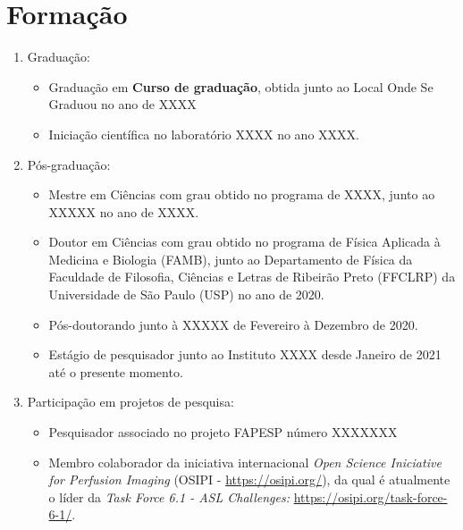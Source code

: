\documentclass[a4paper,oneside,10pt]{article}
\begin{document}
\section{Formação}
\large{
\begin{enumerate}
        \item Graduação:
        \begin{itemize}
                \item Graduação em \textbf{Curso de graduação}, obtida junto ao Local Onde Se Graduou no ano de XXXX \mbox{} \\
                \item Iniciação científica no laboratório XXXX no ano XXXX. %
        \end{itemize}

        \item Pós-graduação:
        \begin{itemize}
                \item Mestre em Ciências com grau obtido no programa de XXXX, junto ao XXXXX no ano de XXXX. %
                \item Doutor em Ciências com grau obtido no programa de Física Aplicada à Medicina e Biologia (FAMB), junto ao Departamento de Física da Faculdade de Filosofia, Ciências e Letras de Ribeirão Preto (FFCLRP) da Universidade de São Paulo (USP) no ano de 2020. %
                \item Pós-doutorando junto à XXXXX de Fevereiro à Dezembro de 2020. %
                \item Estágio de pesquisador junto ao Instituto XXXX desde Janeiro de 2021 até o presente momento. %
        \end{itemize}

        \item Participação em projetos de pesquisa:
        \begin{itemize}
                \item Pesquisador associado no projeto FAPESP número XXXXXXX %
                \item Membro colaborador da iniciativa internacional \textit{Open Science Iniciative for Perfusion Imaging} (OSIPI - \url{https://osipi.org/}), da qual é atualmente o líder 
        da \textit{Task Force 6.1 - ASL Challenges:} \url{https://osipi.org/task-force-6-1/}.
        \end{itemize}


\end{enumerate}}
\end{document}
